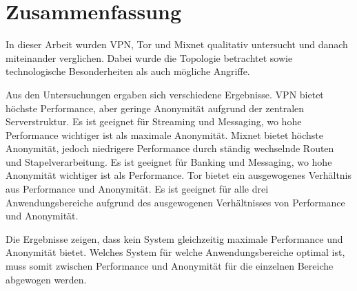 \section{Zusammenfassung}

In dieser Arbeit wurden VPN, Tor und Mixnet qualitativ untersucht und danach miteinander verglichen. Dabei wurde die Topologie betrachtet sowie technologische Besonderheiten als auch mögliche Angriffe.

Aus den Untersuchungen ergaben sich verschiedene Ergebnisse.
VPN bietet höchste Performance, aber geringe Anonymität aufgrund der zentralen Serverstruktur. Es ist geeignet für Streaming und Messaging, wo hohe Performance wichtiger ist als maximale Anonymität.
Mixnet bietet höchste Anonymität, jedoch niedrigere Performance durch ständig wechselnde Routen und Stapelverarbeitung. Es ist geeignet für Banking und Messaging, wo hohe Anonymität wichtiger ist als Performance.
Tor bietet ein ausgewogenes Verhältnis aus Performance und Anonymität. Es ist geeignet für alle drei Anwendungsbereiche aufgrund des ausgewogenen Verhältnisses von Performance und Anonymität.

Die Ergebnisse zeigen, dass kein System gleichzeitig maximale Performance und Anonymität bietet. Welches System für welche Anwendungsbereiche optimal ist, muss somit zwischen Performance und Anonymität für die einzelnen Bereiche abgewogen werden.
